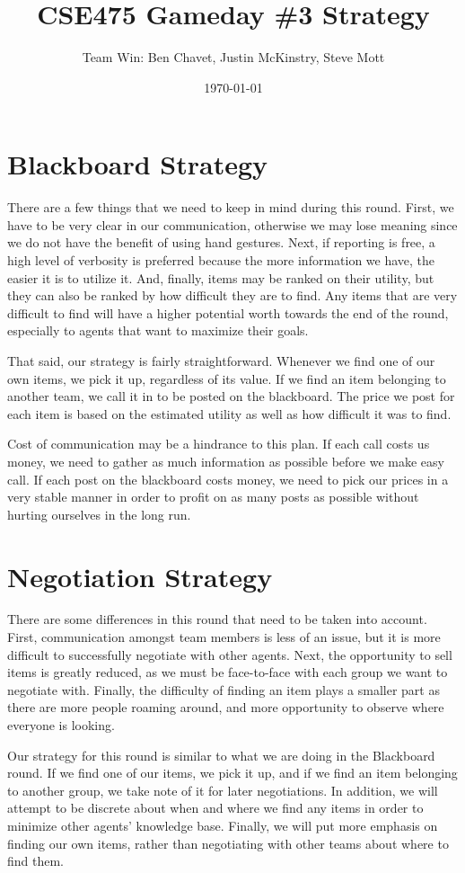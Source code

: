 \documentclass{article}
\title{CSE475 Gameday \#3 Strategy}
\author{Team Win: Ben Chavet, Justin McKinstry, Steve Mott}
\date{\today}
\begin{document}
\maketitle

\section{Blackboard Strategy}

There are a few things that we need to keep in mind during this round.
First, we have to be very clear in our communication, otherwise we may
lose meaning since we do not have the benefit of using hand gestures.
Next, if reporting is free, a high level of verbosity is preferred
because the more information we have, the easier it is to utilize it.
And, finally, items may be ranked on their utility, but they can also
be ranked by how difficult they are to find.  Any items that are very
difficult to find will have a higher potential worth towards the end of
the round, especially to agents that want to maximize their goals.

That said, our strategy is fairly straightforward.  Whenever we find
one of our own items, we pick it up, regardless of its value.  If we
find an item belonging to another team, we call it in to be posted on
the blackboard.  The price we post for each item is based on the
estimated utility as well as how difficult it was to find.

Cost of communication may be a hindrance to this plan.  If each call
costs us money, we need to gather as much information as possible
before we make easy call.  If each post on the blackboard costs money,
we need to pick our prices in a very stable manner in order to profit
on as many posts as possible without hurting ourselves in the long run.

\section{Negotiation Strategy}

There are some differences in this round that need to be taken into
account.  First, communication amongst team members is less of an issue,
but it is more difficult to successfully negotiate with other agents.
Next, the opportunity to sell items is greatly reduced, as we must be
face-to-face with each group we want to negotiate with.  Finally,
the difficulty of finding an item plays a smaller part as there are
more people roaming around, and more opportunity to observe where
everyone is looking.

Our strategy for this round is similar to what we are doing in the
Blackboard round.  If we find one of our items, we pick it up, and
if we find an item belonging to another group, we take note of it for
later negotiations.  In addition, we will attempt to be discrete about
when and where we find any items in order to minimize other agents'
knowledge base.  Finally, we will put more emphasis on finding our
own items, rather than negotiating with other teams about where to
find them.
\end{document}

